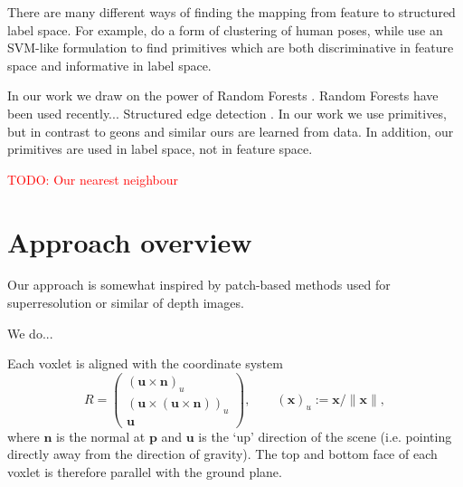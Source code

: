 \documentclass[10pt,twocolumn,letterpaper]{article}
\makeatletter
\renewcommand*{\ie}{i.e.\@\xspace}
\newcommand{\point}{\mathbf{p}}
\newcommand{\normal}{\mathbf{n}}
\newcommand{\updir}{\mathbf{u}}
\newcommand{\todo}[1]{\textcolor{red}{TODO: #1}}
\makeatother
\begin{document}
There are many different ways of finding the mapping from feature to structured label space.
For example, \cite{bourdev-iccv-2009} do a form of clustering of human poses, while \cite{fouhey-iccv-2013} use an SVM-like formulation to find primitives which are both discriminative in feature space and informative in label space.

In our work we draw on the power of Random Forests \cite{}.
Random Forests have been used recently...
Structured edge detection \cite{dollar-iccv-2013}.
In our work we use primitives, but in contrast to geons and similar ours are learned from data.
In addition, our primitives are used in label space, not in feature space.


\todo{Our nearest neighbour}





\section{Approach overview}




Our approach is somewhat inspired by patch-based methods used for superresolution or similar of depth images. 

We do...

Each voxlet is aligned with the coordinate system
\begin{equation}
  R = 
  \left( \begin{array}{ccc}
  (\updir \times \normal)_{u} \\
  (\updir \times (\updir \times \normal)  )_{u} \\
  \updir 
  \end{array}\right), \qquad
  (\mathbf{x})_{u} := \mathbf{x} / \| \mathbf{x} \|,
\end{equation}
where $\normal$ is the normal at $\point$ and $\updir$ is the `up' direction of the scene (\ie pointing directly away from the direction of gravity).
The top and bottom face of each voxlet is therefore parallel with the ground plane.
\end{document}
